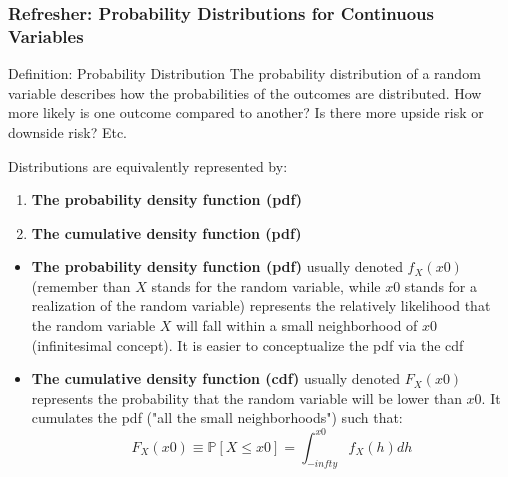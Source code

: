 \documentclass{beamer}
\begin{document}
\begin{frame}
  \frametitle{Refresher: Probability Distributions for Continuous Variables}
  
  \begin{block}{Definition: Probability Distribution}
    The probability distribution of a random variable describes how the probabilities of the outcomes are distributed. How more likely is one outcome compared to another? Is there more upside risk or downside risk? Etc.
  \end{block}

  Distributions are equivalently represented by:
  \begin{enumerate}
  \item \textbf{The probability density function (pdf)}
  \item \textbf{The cumulative density function (pdf)}  
  \end{enumerate}

\end{frame}
  
\begin{frame}
  \begin{itemize}
  \item \textbf{The probability density function (pdf)} usually denoted $f_X(x0)$ (remember than $X$ stands for the random variable, while $x0$ stands for a realization of the random variable) represents the relatively likelihood that the random variable $X$ will fall within a small neighborhood of $x0$ (infinitesimal concept). It is easier to conceptualize the pdf via the cdf
  \item \textbf{The cumulative density function (cdf)} usually denoted $F_X(x0)$ represents the probability that the random variable will be lower than $x0$. It cumulates the pdf ("all the small neighborhoods") such that:
    \begin{equation*}
F_X(x0) \equiv \mathbb{P}[X \leq x0] = \int_{-infty}^{x0} f_X(h) dh      
    \end{equation*}    
  \end{itemize}
  
\end{frame}
\end{document}
